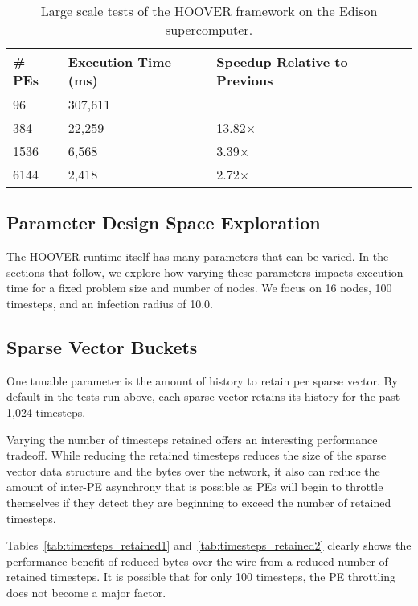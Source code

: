 \begin{table}
\centering
\begin{tabularx}{\textwidth}{ | X || X | X |}
\hline
    \textbf{\# PEs}             & \textbf{Execution Time (ms)} & \textbf{Speedup Relative to Previous} \\\hline
    96                          & 307,611 &               \\\hline
    384                         & 22,259  & 13.82$\times$ \\\hline
    1536                        & 6,568   & 3.39$\times$  \\\hline
    6144                        & 2,418   & 2.72$\times$  \\\hline
\end{tabularx}
\caption{Large scale tests of the HOOVER framework on the Edison supercomputer.}
\label{tab:weak_scaling3}
\end{table}

\subsection{Parameter Design Space Exploration}

The HOOVER runtime itself has many parameters that can be varied. In the
sections that follow, we explore how varying these parameters impacts execution
time for a fixed problem size and number of nodes. We focus on 16 nodes, 100
timesteps, and an infection radius of 10.0.

\subsection{Sparse Vector Buckets}

One tunable parameter is the amount of history to retain per sparse vector. By
default in the tests run above, each sparse vector retains its history for the
past 1,024 timesteps.

Varying the number of timesteps retained offers an interesting performance
tradeoff. While reducing the retained timesteps reduces the size of the sparse
vector data structure and the bytes over the network, it also can reduce the amount
of inter-PE asynchrony that is possible as PEs will begin to throttle themselves
if they detect they are beginning to exceed the number of retained timesteps.

Tables~\ref{tab:timesteps_retained1} and~\ref{tab:timesteps_retained2} clearly shows the performance benefit of
reduced bytes over the wire from a reduced number of retained timesteps. It is
possible that for only 100 timesteps, the PE throttling does not become a major
factor.

